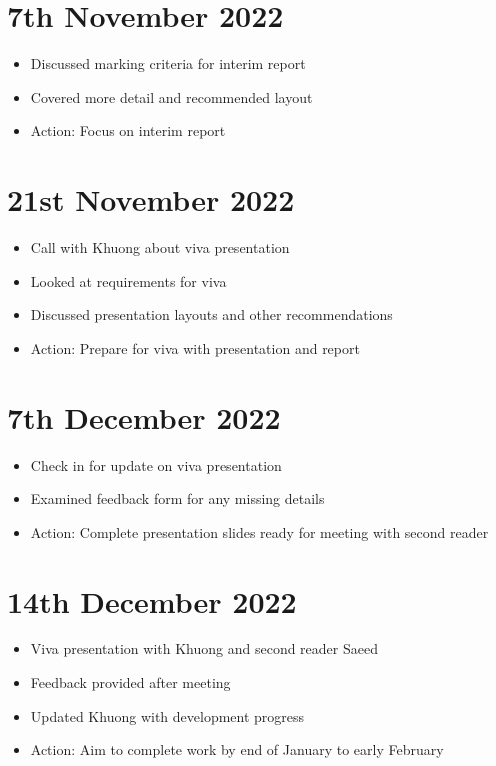 \section{7th November 2022}
\begin{itemize}
    \item Discussed marking criteria for interim report
    \item Covered more detail and recommended layout
    \item Action: Focus on interim report
\end{itemize}

\section{21st November 2022}
\begin{itemize}
    \item Call with Khuong about viva presentation
    \item Looked at requirements for viva
    \item Discussed presentation layouts and other recommendations
    \item Action: Prepare for viva with presentation and report
\end{itemize}

\section{7th December 2022}
\begin{itemize}
    \item Check in for update on viva presentation
    \item Examined feedback form for any missing details
    \item Action: Complete presentation slides ready for meeting with second reader
\end{itemize}


\section{14th December 2022}
\begin{itemize}
    \item Viva presentation with Khuong and second reader Saeed
    \item Feedback provided after meeting
    \item Updated Khuong with development progress
    \item Action: Aim to complete work by end of January to early February
\end{itemize}

